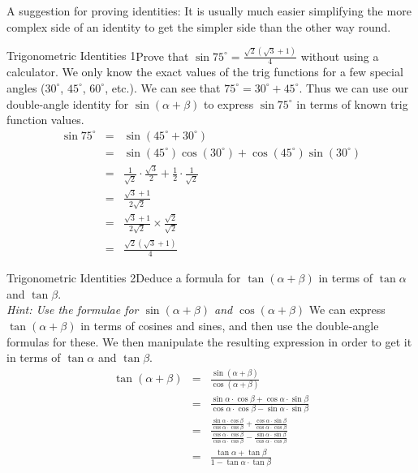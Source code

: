 A suggestion for proving identities: It is usually much easier simplifying the more complex side of an identity to get the simpler side than the other way round. 


\begin{wex}{Trigonometric Identities 1}{Prove that $\sin 75^\circ=\frac{\sqrt{2}(\sqrt{3}+1)}{4}$ without using a calculator.}
{
We only know the exact values of the trig functions for a few special angles ($30^\circ$, $45^\circ$, $60^\circ$, etc.). We can see that $75^\circ=30^\circ+45^\circ$. Thus we can use our double-angle identity for $\sin(\alpha+\beta)$ to express $\sin 75^\circ$ in terms of known trig function values.
\begin{eqnarray*}
\sin 75^\circ&=&\sin(45^\circ+30^\circ)\\
&=&\sin(45^\circ)\cos(30^\circ)+\cos(45^\circ)\sin(30^\circ)\\
&=&\frac{1}{\sqrt{2}}\cdot\frac{\sqrt{3}}{2}+\frac{1}{2}\cdot\frac{1}{\sqrt{2}}\\
&=&\frac{\sqrt{3}+1}{2\sqrt{2}}\\
&=&\frac{\sqrt{3}+1}{2\sqrt{2}}\times\frac{\sqrt{2}}{\sqrt{2}}\\
&=&\frac{\sqrt{2}(\sqrt{3}+1)}{4}
\end{eqnarray*}
}
\end{wex}






\begin{wex}{Trigonometric Identities 2}{Deduce a formula for $\tan(\alpha+\beta)$ in terms of $\tan\alpha$ and $\tan\beta$.\\
\emph{Hint: Use the formulae for $\sin(\alpha+\beta)$ and $\cos(\alpha+\beta)$} }
{
We can express $\tan(\alpha+\beta)$ in terms of cosines and sines, and then use the double-angle formulas for these. We then manipulate the resulting expression in order to get it in terms of $\tan\alpha$ and $\tan\beta$.
\begin{eqnarray*}
\tan(\alpha+\beta)&=&\frac{\sin(\alpha+\beta)}{\cos(\alpha+\beta)}\\
&=&\frac{\sin\alpha\cdot\cos\beta+\cos\alpha\cdot\sin\beta}{\cos\alpha\cdot\cos\beta-\sin\alpha\cdot\sin\beta}\\
&=&\frac{\frac{\sin\alpha\cdot\cos\beta}{\cos\alpha\cdot\cos\beta}+\frac{\cos\alpha\cdot\sin\beta}{\cos\alpha\cdot\cos\beta}}{\frac{\cos\alpha\cdot\cos\beta}{\cos\alpha\cdot\cos\beta}-\frac{\sin\alpha\cdot\sin\beta}{\cos\alpha\cdot\cos\beta}}\\
&=& \frac{\tan\alpha+\tan\beta}{1-\tan\alpha\cdot\tan\beta}
\end{eqnarray*}
}
\end{wex}

